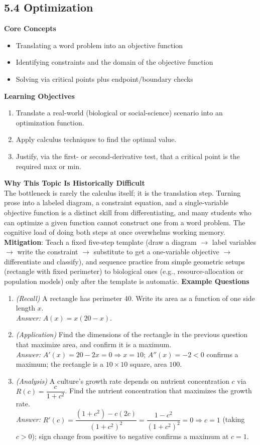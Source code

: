 \documentclass[11pt]{article}
\begin{document}
\subsection{5.4 Optimization}
\textbf{Core Concepts}
\begin{itemize}
\item Translating a word problem into an objective function
\item Identifying constraints and the domain of the objective function
\item Solving via critical points plus endpoint/boundary checks
\end{itemize}
\textbf{Learning Objectives}
\begin{enumerate}
\item Translate a real-world (biological or social-science) scenario into an optimization function.
\item Apply calculus techniques to find the optimal value.
\item Justify, via the first- or second-derivative test, that a critical point is the required max or min.
\end{enumerate}
\textbf{Why This Topic Is Historically Difficult} \\
The bottleneck is rarely the calculus itself; it is the translation step. Turning prose into a labeled diagram, a constraint equation, and a single-variable objective function is a distinct skill from differentiating, and many students who can optimize a given function cannot construct one from a word problem. The cognitive load of doing both steps at once overwhelms working memory. \\
\textbf{Mitigation}: Teach a fixed five-step template (draw a diagram $\to$ label variables $\to$ write the constraint $\to$ substitute to get a one-variable objective $\to$ differentiate and classify), and sequence practice from simple geometric setups (rectangle with fixed perimeter) to biological ones (e.g., resource-allocation or population models) only after the template is automatic.
\textbf{Example Questions}
\begin{enumerate}
\item \emph{(Recall)} A rectangle has perimeter 40. Write its area as a function of one side length $x$. \\
\textit{Answer:} $A(x) = x(20-x)$.
\item \emph{(Application)} Find the dimensions of the rectangle in the previous question that maximize area, and confirm it is a maximum. \\
\textit{Answer:} $A'(x)=20-2x=0\Rightarrow x=10$; $A''(x)=-2<0$ confirms a maximum; the rectangle is a $10\times10$ square, area $100$.
\item \emph{(Analysis)} A culture's growth rate depends on nutrient concentration $c$ via $R(c) = \dfrac{c}{1+c^2}$. Find the nutrient concentration that maximizes the growth rate. \\
\textit{Answer:} $R'(c) = \dfrac{(1+c^2)-c(2c)}{(1+c^2)^2} = \dfrac{1-c^2}{(1+c^2)^2}=0 \Rightarrow c=1$ (taking $c>0$); sign change from positive to negative confirms a maximum at $c=1$.
\end{enumerate}
\end{document}
